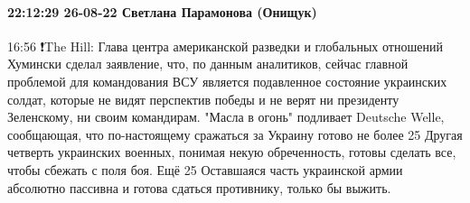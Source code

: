 \paragraph{22:12:29 26-08-22 Светлана Парамонова (Онищук)}
16:56
❗️The Hill: Глава центра американской разведки и глобальных отношений Хумински сделал заявление, что, по данным аналитиков, сейчас главной проблемой для командования ВСУ является подавленное состояние украинских солдат, которые не видят перспектив победы и не верят ни президенту Зеленскому, ни своим командирам.
"Масла в огонь" подливает Deutsche Welle, сообщающая, что по-настоящему сражаться за Украину готово не более 25%
Другая четверть украинских военных, понимая некую обреченность, готовы сделать все, чтобы сбежать с поля боя.
Ещё 25%
Оставшаяся часть украинской армии абсолютно пассивна и готова сдаться противнику, только бы выжить.






